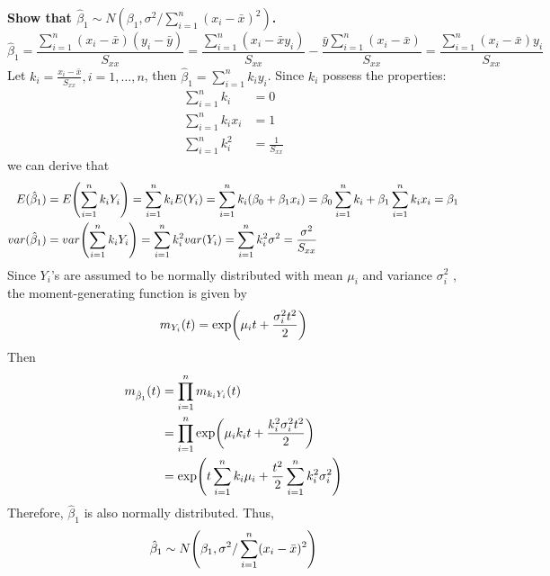 \documentclass[10pt]{report}
\newcommand{\ds}{\displaystyle}
\DeclarePairedDelimiter\autoparen{(}{)}
\newcommand{\pa}[1]{\autoparen*{#1}}
\begin{document}
{\large\bf Show that $\hat{\beta}_1 \sim N(\beta_1, \sigma^2/\sum_{i=1}^{n} (x_i - \bar{x})^2)$.}
\[
\hat{\beta}_1 = \frac{\sum_{i=1}^{n} (x_i - \bar{x})(y_i - \bar{y})}{S_{xx}} = \frac{\sum_{i=1}^{n} (x_i - \bar{x}y_i)}{S_{xx}} - \frac{\bar{y}\sum_{i=1}^{n} (x_i - \bar{x})}{S_{xx}} = \frac{\sum_{i=1}^{n} (x_i-\bar{x})y_i}{S_{xx}}
\]
Let $k_i = \frac{x_i - \bar{x}}{S_{xx}}, i=1,\dots,n$, then $\hat{\beta}_1 = \sum_{i=1}^{n} k_i y_i$. Since $k_i$ possess the properties:
\begin{align*}
	\sum_{i=1}^{n} k_i &= 0\\
	\sum_{i=1}^{n} k_i x_i &= 1\\
	\sum_{i=1}^{n} k_i^2 &= \frac{1}{S_{xx}}
\end{align*}
we can derive that
\begin{align*}
	E(\hat{\beta}_1) &= E\pa{\sum_{i=1}^{n} k_i Y_i} = \sum_{i=1}^{n} k_i E(Y_i) = \sum_{i=1}^{n} k_i (\beta_0 + \beta_1 x_i) = \beta_0 \sum_{i=1}^{n} k_i + \beta_1 \sum_{i=1}^{n} k_i x_i = \beta_1\\
	var(\hat{\beta}_1) &= var\pa{\sum_{i=1}^{n} k_i Y_i} = \sum_{i=1}^{n} k_i^2 var(Y_i) = \sum_{i=1}^{n} k_i^2\sigma^2 = \frac{\sigma^2}{S_{xx}}
\end{align*}
Since $Y_i$'s are assumed to be normally distributed with mean $\mu_i$ and variance $\sigma_i^2$ , the moment-generating function is given by
\[
m_{Y_i}(t) = \exp\pa{\mu_i t + \frac{\sigma_i^2 t^2}{2}}
\]
Then
\begin{align*}
	m_{\hat{\beta}_1}(t)
	&= \prod_{i=1}^n m_{k_i Y_i}(t)\\ \ds
	&= \prod_{i=1}^n \exp\pa{\mu_i k_i t + \frac{k_i^2 \sigma_i^2 t^2}{2}}\\
	&= \exp\pa{t\sum_{i=1}^{n} k_i \mu_i + \frac{t^2}{2} \sum_{i=1}^{n} k_i^2 \sigma_i^2}
\end{align*}
Therefore, $\hat{\beta}_1$ is also normally distributed. Thus,
\[
\hat{\beta}_1 \sim N\pa{\beta_1, \sigma^2/\sum_{i=1}^{n} (x_i - \bar{x})^2}
\]
\end{document}
